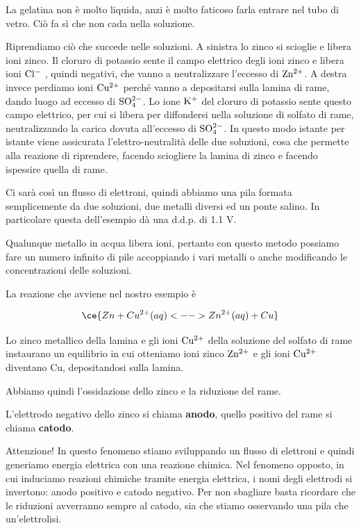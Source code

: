 La gelatina non è molto liquida, anzi è molto faticoso farla entrare nel tubo di vetro. Ciò fa sì che non cada nella soluzione.

Riprendiamo ciò che succede nelle soluzioni. A sinistra lo zinco si scioglie e libera ioni zinco. Il cloruro di potassio sente il campo elettrico degli ioni zinco e libera ioni $\rm Cl^-$ , quindi negativi, che vanno a neutralizzare l'eccesso di $\rm Zn^{2+}$. A destra invece perdiamo ioni $\rm Cu^{2+}$ perché vanno a depositarsi sulla lamina di rame, dando luogo ad eccesso di $\rm SO_4^{2-}$. Lo ione $\rm K^+$ del cloruro di potassio sente questo campo elettrico, per cui si libera per diffondersi nella soluzione di solfato di rame, neutralizzando la carica dovuta all'eccesso di $\rm SO_4^{2-}$. In questo modo istante per istante viene assicurata l'elettro-neutralità delle due soluzioni, cosa che permette alla reazione di riprendere, facendo sciogliere la lamina di zinco e facendo ispessire quella di rame.

Ci sarà così un flusso di elettroni, quindi abbiamo una pila formata semplicemente da due soluzioni, due metalli diversi ed un ponte salino. In particolare questa dell'esempio dà una d.d.p. di 1.1 V.

Qualunque metallo in acqua libera ioni, pertanto con questo metodo possiamo fare un numero infinito di pile accoppiando i vari metalli o anche modificando le concentrazioni delle soluzioni.

La reazione che avviene nel nostro esempio è

$$\ce{Zn + Cu^{2+}(aq) <--> Zn^{2+}(aq) + Cu}$$

Lo zinco metallico della lamina e gli ioni $\rm Cu^{2+}$ della soluzione del solfato di rame instaurano un equilibrio in cui otteniamo ioni zinco $\rm Zn^{2+}$ e gli ioni $\rm Cu^{2+}$ diventano Cu, depositandosi sulla lamina.

Abbiamo quindi l'ossidazione dello zinco e la riduzione del rame.

L'elettrodo negativo dello zinco si chiama \textbf{anodo}, quello positivo del rame si chiama \textbf{catodo}.

Attenzione! In questo fenomeno stiamo sviluppando un flusso di elettroni e quindi generiamo energia elettrica con una reazione chimica. Nel fenomeno opposto, in cui induciamo reazioni chimiche tramite energia elettrica, i nomi degli elettrodi si invertono: anodo positivo e catodo negativo. Per non sbagliare basta ricordare che le riduzioni avverranno sempre al catodo, sia che stiamo osservando una pila che un'elettrolisi.


